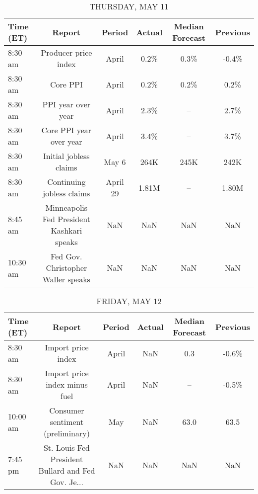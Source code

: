 \documentclass{article}%
\begin{document}
%


\begin{table}[htbp]%
\caption{THURSDAY, MAY 11}%
\centering%
\begin{adjustbox}{width=1\textwidth}%
\begin{tabular}{lccccc}
\toprule
Time (ET) &                                    Report &   Period & Actual & Median Forecast & Previous \\
\midrule
  8:30 am &                      Producer price index &    April &   0.2\% &            0.3\% &    -0.4\% \\
  8:30 am &                                  Core PPI &    April &   0.2\% &            0.2\% &     0.2\% \\
  8:30 am &                        PPI year over year &    April &   2.3\% &              -- &     2.7\% \\
  8:30 am &                   Core PPI year over year &    April &   3.4\% &              -- &     3.7\% \\
  8:30 am &                    Initial jobless claims &    May 6 &   264K &            245K &     242K \\
  8:30 am &                 Continuing jobless claims & April 29 &  1.81M &              -- &    1.80M \\
  8:45 am & Minneapolis Fed President Kashkari speaks &      NaN &    NaN &             NaN &      NaN \\
 10:30 am &        Fed Gov. Christopher Waller speaks &      NaN &    NaN &             NaN &      NaN \\
\bottomrule
\end{tabular}
%
\end{adjustbox}%
\end{table}

%


\begin{table}[htbp]%
\caption{FRIDAY, MAY 12}%
\centering%
\begin{adjustbox}{width=1\textwidth}%
\begin{tabular}{lccccc}
\toprule
Time (ET) &                                             Report & Period & Actual & Median Forecast & Previous \\
\midrule
  8:30 am &                                 Import price index &  April &    NaN &             0.3 &    -0.6\% \\
  8:30 am &                      Import price index minus fuel &  April &    NaN &              -- &    -0.5\% \\
 10:00 am &                   Consumer sentiment (preliminary) &    May &    NaN &            63.0 &     63.5 \\
  7:45 pm & St. Louis Fed President Bullard and Fed Gov. Je... &    NaN &    NaN &             NaN &      NaN \\
\bottomrule
\end{tabular}
%
\end{adjustbox}%
\end{table}
\end{document}
